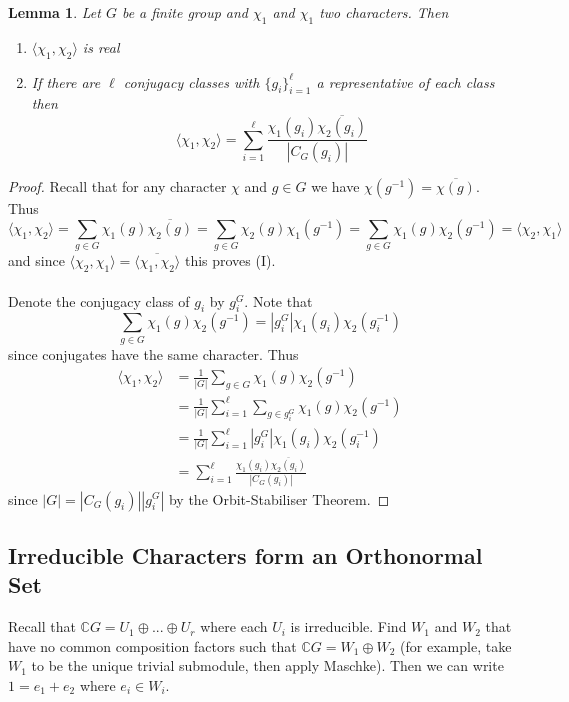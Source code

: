 \documentclass[11pt, notitlepage]{article}
\numberwithin{equation}{section}
\theoremstyle{plain}
\newtheorem{lemma}[theorem]{Lemma}
\theoremstyle{definition}
\newcommand{\CG}{{\mathbb{C}G}}
\begin{document}
\begin{lemma}
	Let $G$ be a finite group and $\chi_1$ and $\chi_1$  two characters. Then 
	\begin{enumerate}[label=\emph{(\Roman*)}]
		\item $\langle \chi_1, \chi_2 \rangle$ is real
		\item If there are $\ell$ conjugacy classes with $\{g_i\}_{i = 1}^\ell$ a representative of each class then \[ \langle \chi_1, \chi_2 \rangle = \sum_{i = 1}^\ell \frac{\chi_1(g_i) \overline{\chi_2(g_i)}}{|C_G(g_i)|} \]
	\end{enumerate}
\end{lemma}
\begin{proof}
	Recall that for any character $\chi$ and $g\in G$ we have $\chi(g^{-1}) = \overline{\chi(g)}$. Thus \[\langle \chi_1, \chi_2 \rangle = \sum_{g\in G} \chi_1(g)\overline{\chi_2(g)} = \sum_{g\in G} \chi_2(g)\chi_1(g^{-1})= \sum_{g\in G} \chi_1(g)\chi_2(g^{-1}) = \langle \chi_2, \chi_1 \rangle\] and since $\langle \chi_2, \chi_1 \rangle = \overline{\langle \chi_1, \chi_2 \rangle}$ this proves (I).
	\\\\
	Denote the conjugacy class of $g_i$ by $g_i^G$. Note that \[ \sum_{g\in G} \chi_1(g) \chi_2(g^{-1}) = |g_i^G| \chi_1(g_i)\chi_2(g_i^{-1})\] since conjugates have the same character. Thus 
	\begin{align*}
		\langle \chi_1, \chi_2 \rangle &= \frac{1}{|G|} \sum_{g\in G} \chi_1(g) \chi_2(g^{-1}) \\
		&= \frac{1}{|G|} \sum_{i = 1}^\ell \sum_{g\in g_i^G} \chi_1(g) \chi_2(g^{-1}) \\
		&= \frac{1}{|G|}\sum_{i = 1}^\ell |g_i^G|\chi_1(g_i)\chi_2(g_i^{-1}) \\
		&= \sum_{i = 1}^\ell \frac{\chi_1(g_i) \overline{\chi_2(g_i)}}{|C_G(g_i)|}
	\end{align*}
	since $|G| = |C_G(g_i)||g_i^G|$ by the Orbit-Stabiliser Theorem.
\end{proof}

\subsection{Irreducible Characters form an Orthonormal Set}
Recall that $\CG = U_1 \oplus ... \oplus U_r$ where each $U_i$ is irreducible. Find $W_1$ and $W_2$ that have no common composition factors such that $\CG = W_1 \oplus W_2$ (for example, take $W_1$ to be the unique trivial submodule, then apply Maschke). Then we can write $1 = e_1 + e_2$ where $e_i\in W_i$. 
\end{document}
